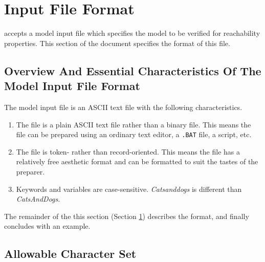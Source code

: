 %
\section{Input File Format}
\label{siff0}

\swname{} accepts a model input file which specifies the model 
to be verified for reachability properties.  This section of the
document specifies the format of this file.


\subsection{Overview And Essential Characteristics Of The Model Input File Format}
\label{siff0:soec0}

The model input file is an ASCII text file with the following characteristics.

\begin{enumerate}
\item The file is a plain ASCII text file rather than a binary file.
      This means the file can be prepared using an ordinary text editor, a 
      \texttt{.BAT} file, a script, etc.
\item The file is token- rather than record-oriented.  
      This means the file has a relatively free aesthetic format and can be 
      formatted to suit the tastes of the preparer.
\item Keywords and variables are case-sensitive.  
      \emph{Catsanddogs} is different than \emph{CatsAndDogs}.
\end{enumerate}

The remainder of the this section (Section \ref{siff0})
describes the format, and finally concludes with an example.


\subsection{Allowable Character Set}
\label{siff0:sacs0}

